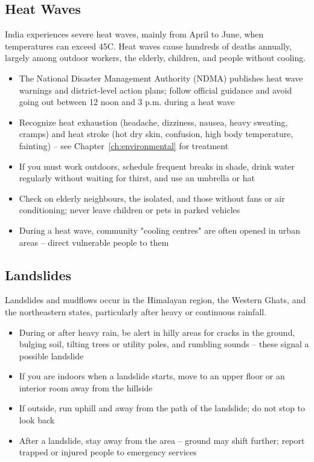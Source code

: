 \subsection{Heat Waves}

India experiences severe heat waves, mainly from April to June, when temperatures can exceed 45\textdegree C. Heat waves cause hundreds of deaths annually, largely among outdoor workers, the elderly, children, and people without cooling.

\begin{itemize}
  \item The National Disaster Management Authority (NDMA) publishes heat wave warnings and district-level action plans; follow official guidance and avoid going out between 12 noon and 3 p.m. during a heat wave
  \item Recognize heat exhaustion (headache, dizziness, nausea, heavy sweating, cramps) and heat stroke (hot dry skin, confusion, high body temperature, fainting) -- see Chapter~\ref{ch:environmental} for treatment
  \item If you must work outdoors, schedule frequent breaks in shade, drink water regularly without waiting for thirst, and use an umbrella or hat
  \item Check on elderly neighbours, the isolated, and those without fans or air conditioning; never leave children or pets in parked vehicles
  \item During a heat wave, community "cooling centres" are often opened in urban areas -- direct vulnerable people to them
\end{itemize}

\subsection{Landslides}

Landslides and mudflows occur in the Himalayan region, the Western Ghats, and the northeastern states, particularly after heavy or continuous rainfall.

\begin{itemize}
  \item During or after heavy rain, be alert in hilly areas for cracks in the ground, bulging soil, tilting trees or utility poles, and rumbling sounds -- these signal a possible landslide
  \item If you are indoors when a landslide starts, move to an upper floor or an interior room away from the hillside
  \item If outside, run uphill and away from the path of the landslide; do not stop to look back
  \item After a landslide, stay away from the area -- ground may shift further; report trapped or injured people to emergency services
\end{itemize}

